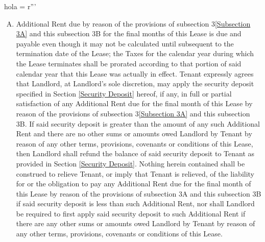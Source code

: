 hola = r'''\documentclass{article}
\newcommand{\corpaddress}{12955 Biscayne Boulevard, Suite 406B, North Miami, FL 33181}
\begin{document}
\begin{enumerate}[(A)]
\begin{enumerate}[I]
         Anything herein to the contrary notwithstanding, Tenant shall not delay or withhold payment of any balance shown to be due pursuant to a statement rendered by Landlord to Tenant, pursuant to the terms hereof, because of any objection which Tenant may raise with respect thereto.  Any over payment found to be owing to Tenant shall be refunded to Tenant within a reasonable time, presuming Tenant does not owe any other rent (or other sums) under the Lease.

         Each payment of Additional Rent shall be without any offset or deduction whatever, on or before the first day of the month, in lawful (legal tender for public or private debts) money of the United States of America, at \corpaddress{} or elsewhere as designated from time to time by Landlord's written notice to Tenant.

        In addition to Additional Rent, Tenant shall pay to Landlord each month a sum equal to any sales tax, tax on rentals, and any other charges, taxes and/or impositions now in existence or hereafter imposed based upon the privilege of renting the space leased hereunder or upon the amount of rentals collected therefor. Nothing herein shall, however, be taken to require Tenant to pay any part of any Federal and State Taxes on income imposed upon Landlord.

        \end{enumerate}
        \item Additional Rent due by reason of the provisions of subsection 3\ref{Subsection 3A} and this subsection 3B for the final months of this Lease is due and payable even though it may not be calculated until subsequent to the termination date of the Lease; the Taxes for the calendar year during which the Lease terminates shall be prorated according to that portion of said calendar year that this Lease was actually in effect. Tenant expressly agrees that Landlord, at Landlord's sole discretion, may apply the security deposit specified in Section \ref{Security Deposit} hereof, if any, in full or partial satisfaction of any Additional Rent due for the final month of this Lease by reason of the provisions of subsection 3\ref{Subsection 3A} and this subsection 3B. If said security deposit is greater than the amount of any such Additional Rent and there are no other sums or amounts owed Landlord by Tenant by reason of any other terms, provisions, covenants or conditions of this Lease, then Landlord shall refund the balance of said security deposit to Tenant as provided in Section \ref{Security Deposit}. Nothing herein contained shall be construed to relieve Tenant, or imply that Tenant is relieved, of the liability for or the obligation to pay any Additional Rent due for the final month of this Lease by reason of the provisions of subsection 3A and this subsection 3B if said security deposit is less than such Additional Rent, nor shall Landlord be required to first apply said security deposit to such Additional Rent if there are any other sums or amounts owed Landlord by Tenant by reason of any other terms, provisions, covenants or conditions of this Lease.


\end{enumerate}
\end{document}

